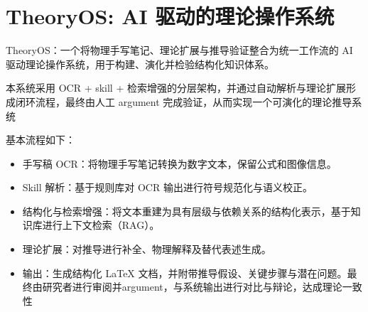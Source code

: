 \section{TheoryOS: AI 驱动的理论操作系统}
TheoryOS：一个将物理手写笔记、理论扩展与推导验证整合为统一工作流的 AI 驱动理论操作系统，用于构建、演化并检验结构化知识体系。

本系统采用 OCR + skill + 检索增强的分层架构，并通过自动解析与理论扩展形成闭环流程，最终由人工 argument 完成验证，从而实现一个可演化的理论推导系统

基本流程如下：
\begin{itemize}
    \item 手写稿 OCR：将物理手写笔记转换为数字文本，保留公式和图像信息。
    \item Skill 解析：基于规则库对 OCR 输出进行符号规范化与语义校正。
    \item 结构化与检索增强：将文本重建为具有层级与依赖关系的结构化表示，基于知识库进行上下文检索（RAG）。
    \item 理论扩展：对推导进行补全、物理解释及替代表述生成。
    \item 输出：生成结构化 LaTeX 文档，并附带推导假设、关键步骤与潜在问题。最终由研究者进行审阅并argument，与系统输出进行对比与辩论，达成理论一致性
\end{itemize}
